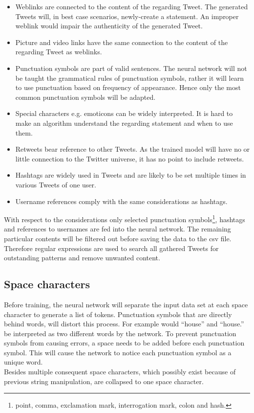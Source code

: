 \documentclass[conference]{IEEEtran}
\begin{document}
\begin{itemize}
\item Weblinks are connected to the content of the regarding Tweet. The generated Tweets will, in best case scenarios, newly-create a statement. An improper weblink would impair the authenticity of the generated Tweet.
\item Picture and video links have the same connection to the content of the regarding Tweet as weblinks.
\item Punctuation symbols are part of valid sentences. The neural network will not be taught the grammatical rules of punctuation symbols, rather it will learn to use punctuation based on frequency of appearance. Hence only the most common punctuation symbols will be adapted.
\item Special characters e.g. emoticons can be widely interpreted. It is hard to make an algorithm understand the regarding statement and when to use them. 
\item Retweets bear reference to other Tweets. As the trained model will have no or little connection to the Twitter universe, it has no point to include retweets.
\item Hashtags are widely used in Tweets and are likely to be set multiple times in various Tweets of one user.
\item Username references comply with the same considerations as hashtags.
\end{itemize}

With respect to the considerations only selected punctuation symbols\footnote{point, comma, exclamation mark, interrogation mark, colon and hash.},  hashtags and references to usernames are fed into the neural network. The remaining particular contents will be filtered out before saving the data to the csv file. Therefore regular expressions are used to search all gathered Tweets for outstanding patterns and remove unwanted content.

\subsection{Space characters}\label{subsec_space_characters}

Before training, the neural network will separate the input data set at each space character to generate a list of tokens. Punctuation symbols that are directly behind words, will distort this process. For example would ``house'' and ``house.'' be interpreted as two different words by the network. To prevent punctuation symbols from causing errors, a space needs to be added before each punctuation symbol. This will cause the network to notice each punctuation symbol as a unique word.\\
Besides multiple consequent space characters, which possibly exist because of previous string manipulation, are collapsed to one space character.
\end{document}
